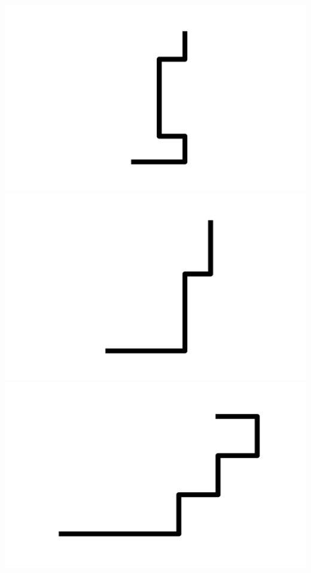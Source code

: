 \documentclass[]{report}
\begin{document}
\includegraphics[scale=.1]{pictures/21/state_cluster_shapes_310.pdf} 
\includegraphics[scale=.1]{pictures/21/state_cluster_shapes_311.pdf} 
\includegraphics[scale=.1]{pictures/21/state_cluster_shapes_312.pdf} 
\end{document}
